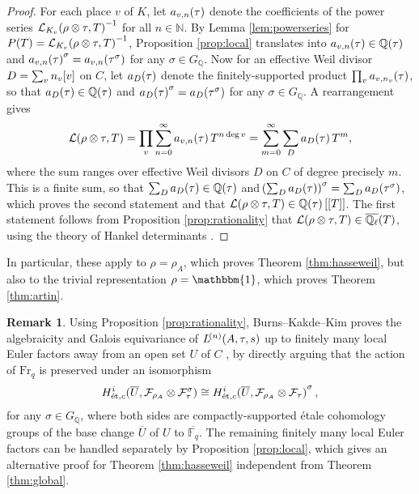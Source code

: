 \documentclass{article}
\theoremstyle{definition}
\theoremstyle{definition}
\newtheorem{remark}[n]{Remark}
\newcommand{\et}{\text{\'et}}
\newcommand{\FF}{\mathbb{F}}
\newcommand{\FFF}{\mathcal{F}}
\newcommand{\Fr}{\mathrm{Fr}}
\newcommand{\LLL}{\mathcal{L}}
\newcommand{\NN}{\mathbb{N}}
\newcommand{\QQ}{\mathbb{Q}}
\newcommand{\br}{\!\del[0]}
\begin{document}
\begin{proof}
For each place $ v $ of $ K $, let $ a_{v, n}\br{\tau} $ denote the coefficients of the power series $ \LLL_{K_v}\br{\rho \otimes \tau, T}^{-1} $ for all $ n \in \NN $. By Lemma \ref{lem:powerseries} for $ P\br{T} = \LLL_{K_v}\br{\rho \otimes \tau, T}^{-1} $, Proposition \ref{prop:local} translates into $ a_{v, n}\br{\tau} \in \QQ\br{\tau} $ and $ a_{v, n}\br{\tau}^\sigma = a_{v, n}\br{\tau^\sigma} $ for any $ \sigma \in G_\QQ $. Now for an effective Weil divisor $ D = \sum_v n_v\sbr{v} $ on $ C $, let $ a_D\br{\tau} $ denote the finitely-supported product $ \prod_v a_{v, n_v}\br{\tau} $, so that $ a_D\br{\tau} \in \QQ\br{\tau} $ and $ a_D\br{\tau}^\sigma = a_D\br{\tau^\sigma} $ for any $ \sigma \in G_\QQ $. A rearrangement gives
$$ \LLL\br{\rho \otimes \tau, T} = \prod_v \sum_{n = 0}^\infty a_{v, n}\br{\tau}T^{n\deg v} = \sum_{m = 0}^\infty \sum_D a_D\br{\tau}T^m, $$
where the sum ranges over effective Weil divisors $ D $ on $ C $ of degree precisely $ m $. This is a finite sum, so that $ \sum_D a_D\br{\tau} \in \QQ\br{\tau} $ and $ \br{\sum_D a_D\br{\tau}}^\sigma = \sum_D a_D\br{\tau^\sigma} $, which proves the second statement and that $ \LLL\br{\rho \otimes \tau, T} \in \QQ\br{\tau}[[T]] $. The first statement follows from Proposition \ref{prop:rationality} that $ \LLL\br{\rho \otimes \tau, T} \in \overline{\QQ_\ell}\br{T} $, using the theory of Hankel determinants \cite[Chapter IV.4, Exercise 1]{Bou03}.
\end{proof}

In particular, these apply to $ \rho = \rho_A $, which proves Theorem \ref{thm:hasseweil}, but also to the trivial representation $ \rho = \mathbbm{1} $, which proves Theorem \ref{thm:artin}.

\begin{remark}
Using Proposition \ref{prop:rationality}, Burns--Kakde--Kim proves the algebraicity and Galois equivariance of $ L^{\br{n}}\br{A, \tau, s} $ up to finitely many local Euler factors away from an open set $ U $ of $ C $ \cite[Proposition 2.2]{BKK18}, by directly arguing that the action of $ \Fr_q $ is preserved under an isomorphism
$$ H_{\et, c}^i\br{\overline{U}, \FFF_{\rho_A} \otimes \FFF_\tau^\sigma} \cong H_{\et, c}^i\br{\overline{U}, \FFF_{\rho_A} \otimes \FFF_\tau}^\sigma, $$
for any $ \sigma \in G_\QQ $, where both sides are compactly-supported \'etale cohomology groups of the base change $ \overline{U} $ of $ U $ to $ \overline{\FF_q} $. The remaining finitely many local Euler factors can be handled separately by Proposition \ref{prop:local}, which gives an alternative proof for Theorem \ref{thm:hasseweil} independent from Theorem \ref{thm:global}.
\end{remark}
\end{document}
